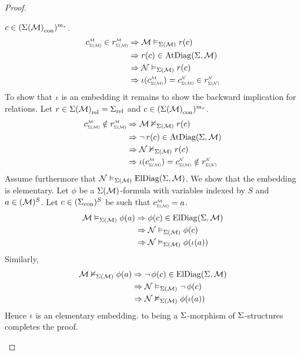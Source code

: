 \begin{proof}
\begin{forward}
        $c \in ({\Sigma(\mathcal{M})}_\mathrm{con})^{m_r}$.
        \begin{align*}
            \subintp{\Si(\MM)}{\MM}{c}\in \subintp{\Si(\MM)}{\MM}{r} 
            &\implies \MM \model{\Si(\MM)} r(c)\\
            &\implies r(c) \in \atdiag{\Si}{\MM}\\
            &\implies \NN \model{\Si(\MM)} r(c) \\
            &\implies \io(\subintp{\Si(\MM)}{\MM}{c}) = 
            \subintp{\Si(\MM)}{\NN}{c} \in \subintp{\Si(\NN)}{\NN}{r} 
        \end{align*}
        To show that $\iota$ is an embedding it remains to show 
        the backward implication for relations.
        Let $r \in {\Sigma(\mathcal{M})}_\mathrm{rel} = {\Sigma}_\mathrm{rel}$ and 
        $c \in ({\Sigma(\mathcal{M})}_\mathrm{con})^{m_r}$.
        \begin{align*}
            \subintp{\Si(\MM)}{\MM}{c} \notin \subintp{\Si(\MM)}{\MM}{r} 
            &\implies \MM \nodel{\Si(\MM)} r(c)\\
            &\implies \NOT r(c) \in \atdiag{\Si}{\MM}\\
            &\implies \NN \nodel{\Si(\MM)} r(c) \\
            &\implies \io(\subintp{\Si(\MM)}{\MM}{c}) = 
            \subintp{\Si(\MM)}{\NN}{c} \notin \subintp{\Si(\NN)}{\NN}{r} 
        \end{align*}
        Assume furthermore that $\mathcal{N} \vDash_{\Sigma(\mathcal{M})} \mathrm{ElDiag}(\Sigma,\mathcal{M})$.
        We show that the embedding is elementary.
        Let $\phi$ be a $\Sigma(\mathcal{M})$-formula
        with variables indexed by $S$
        and $a \in ({\mathcal{M}})^S$.
        Let $c \in ({\Sigma}_\mathrm{con})^S$ be such that 
        $\subintp{\Si(\MM)}{\MM}{c} = a$.
        \begin{align*}
            \mathcal{M} \vDash_{\Sigma(\mathcal{M})} \phi(a) 
                &\Rightarrow \phi(c) \in \mathrm{ElDiag}(\Sigma,\mathcal{M})\\
                &\Rightarrow \mathcal{N} \vDash_{\Sigma(\mathcal{M})} \phi(c)\\
                &\Rightarrow \mathcal{N} \vDash_{\Sigma(\mathcal{M})} \phi(\iota(a))
        \end{align*}
        Similarly,
        \begin{align*}
            \mathcal{M} \nvDash_{\Sigma(\mathcal{M})} \phi(a) &\Rightarrow \neg\, \phi(c) 
                \in \mathrm{ElDiag}(\Sigma,\mathcal{M})\\
            &\Rightarrow \mathcal{N} \vDash_{\Sigma(\mathcal{M})} \neg\, \phi(c)\\
            &\Rightarrow \mathcal{N} \nvDash_{\Sigma(\mathcal{M})} \phi(\iota(a))
        \end{align*}
        Hence $\iota$ is an elementary embedding.
         to being a $\Sigma$-morphism of $\Sigma$-structures
        completes the proof.
    \end{forward}


\end{proof}
